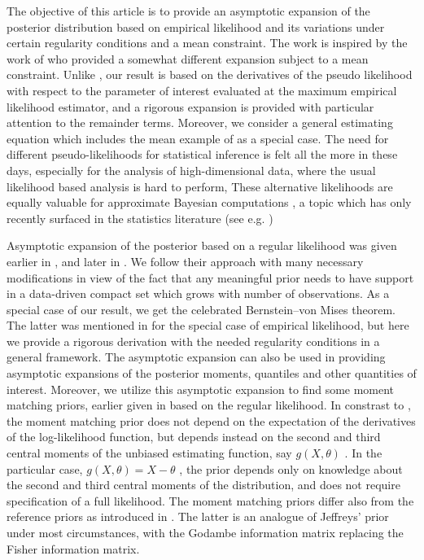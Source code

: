 The objective of this article is to provide an asymptotic expansion
of the posterior distribution based on empirical likelihood and its
variations under certain regularity conditions and a mean constraint.
The work is inspired by the work of \cite{fang2006empirical}%
{} who provided a somewhat different expansion subject to a mean constraint.
Unlike \cite{fang2005expected,fang2006empirical}, our result is
based on the derivatives of the pseudo likelihood with respect to
the parameter of interest evaluated at the maximum empirical likelihood estimator,
and a rigorous expansion is provided with particular attention  to the remainder terms. Moreover, we consider a general estimating
equation which includes the mean example of \cite{fang2006empirical}
as a special case. The need for different pseudo-likelihoods for statistical
inference is felt all the more in these days, especially for the analysis
of high-dimensional data, where the usual likelihood based analysis
is hard to perform, These alternative likelihoods are equally valuable
for approximate Bayesian computations , a topic which has only recently
surfaced in the statistics literature (see e.g. \cite{cornuet2008inferring} )%

Asymptotic expansion of the posterior based on a regular likelihood
was given earlier in \cite{johnson1970asymptotic}, and later in
\cite{ghosh1982expansions}. We follow their approach with many necessary
modifications in view of the fact that any meaningful prior needs
to have support in   a data-driven compact set which grows with number of observations. As a special
case of our result, we get the celebrated Bernstein--von Mises theorem.
The latter was mentioned in \cite{lazar2003bayesian} %
for the special case of empirical likelihood, but here we provide
a rigorous  derivation with the needed regularity conditions in a general framework. The asymptotic expansion can also be used in providing asymptotic expansions of the posterior moments, quantiles and other quantities of interest. Moreover, we utilize this asymptotic expansion to find some moment matching priors, earlier given in \cite{ghosh2011moment} based on the regular likelihood.
In constrast to \cite{ghosh2011moment}, the moment matching prior does not depend on the expectation of the derivatives of the log-likelihood function, but depends instead on the second and third central moments of the unbiased estimating function, say $g\left(X,\theta\right)$ . In the particular case, $g\left(X,\theta\right)=X-\theta$ , the prior depends only on knowledge about the second and third central moments of the distribution, and does not require specification of a full likelihood. The moment matching priors differ also  from the reference priors as  introduced in \cite{clarke2010reference}. The latter is an analogue of Jeffreys' prior under most circumstances, with the Godambe information matrix \citep{godambe1960optimum} replacing the Fisher information matrix.


